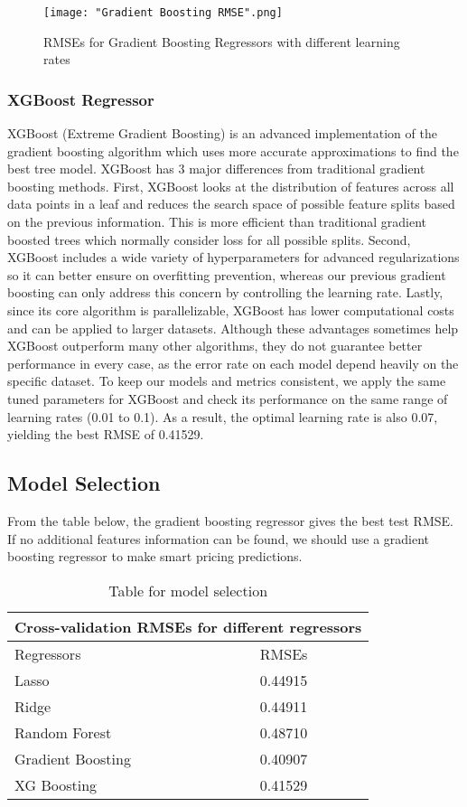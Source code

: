 \documentclass[twocolumn]{article}
\begin{document}
\begin{figure}[h]
    \centering
    \texttt{[image: "Gradient Boosting RMSE".png]}
    \caption{RMSEs for Gradient Boosting Regressors with different learning rates}
\end{figure}

\subsubsection{XGBoost Regressor}
XGBoost (Extreme Gradient Boosting) is an advanced implementation of the gradient boosting algorithm which uses more accurate approximations to find the best tree model. XGBoost has 3 major differences from traditional gradient boosting methods. First, XGBoost looks at the distribution of features across all data points in a leaf and reduces the search space of possible feature splits based on the previous information. This is more efficient than traditional gradient boosted trees which normally consider loss for all possible splits. Second, XGBoost includes a wide variety of hyperparameters for advanced regularizations so it can better ensure on overfitting prevention, whereas our previous gradient boosting can only address this concern by controlling the learning rate. Lastly, since its core algorithm is parallelizable, XGBoost has lower computational costs and can be applied to larger datasets. Although these advantages sometimes help XGBoost outperform many other algorithms, they do not guarantee better performance in every case, as the error rate on each model depend heavily on the specific dataset. To keep our models and metrics consistent, we apply the same tuned parameters for XGBoost and check its performance on the same range of learning rates (0.01 to 0.1). As a result, the optimal learning rate is also 0.07, yielding the best RMSE of 0.41529.


\subsection{Model Selection}
From the table below, the gradient boosting regressor gives the best test RMSE. If no additional features information can be found, we should use a gradient boosting regressor to make smart pricing predictions. 
\begin{table}[h!]
\centering
\begin{tabular}{ |p{3cm}||p{1cm}|  }
 \hline
 \multicolumn{2}{|c|}{Cross-validation RMSEs for different regressors} \\
 \hline
 Regressors& RMSEs\\
 \hline
 Lasso   & 0.44915 \\
 Ridge &  0.44911 \\
 Random Forest & 0.48710 \\
 Gradient Boosting & 0.40907\\
 XG Boosting& 0.41529\\
 \hline
\end{tabular}
\caption{Table for model selection}
\label{table:1}
\end{table}
\end{document}
